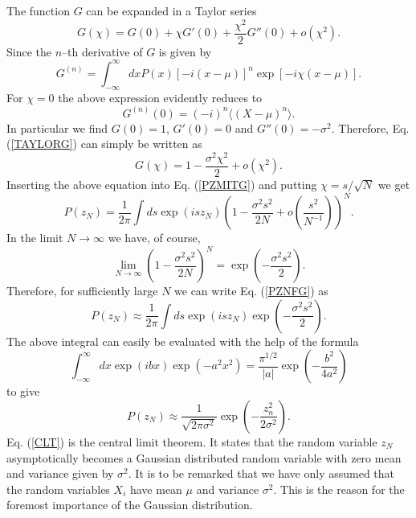 The function $G$ can be expanded in a Taylor series
\begin{equation}\label{TAYLORG}
G(\chi) = G(0) + \chi G'(0) + \frac{\chi^2}{2} G''(0) + o(\chi^2).
\end{equation}
Since the $n$--th derivative of $G$ is given by
\begin{equation}
G^{(n)} = \int_{-\infty}^{\infty} dx P(x) [-i(x-\mu)]^n \exp[-i\chi(x-\mu)].
\end{equation}
For $\chi=0$ the above expression evidently reduces to
\begin{equation}
G^{(n)}(0) = (-i)^n \langle (X-\mu)^n\rangle.
\end{equation}
In particular we find $G(0) =1$, $G'(0)= 0$ and $G''(0) = 
-\sigma^2$.
Therefore, Eq. (\ref{TAYLORG}) can simply be written as
\begin{equation}
G(\chi) = 1 - \frac{\sigma^2\chi^2}{2} + o(\chi^2).
\end{equation}
Inserting the above equation into Eq. (\ref{PZMITG}) 
and putting $\chi=s/{\sqrt{N}}$ we get
\begin{equation}\label{PZNFG}
P(z_N) = \frac{1}{2\pi} \int ds \exp(isz_N)
   \left( 1- \frac{\sigma^2s^2}{2N} + 
   o(\frac{s^2}{N^{-1}})\right)^N.
\end{equation}
In the limit $N\rightarrow \infty$ we have, of course,
\begin{equation}
\lim_{N\rightarrow \infty} \left( 1 - 
\frac{\sigma^2s^2}{2N}\right)^N = \exp(-\frac{\sigma^2 s^2}{2}).
\end{equation}
Therefore, for sufficiently large $N$ we can write Eq. (\ref{PZNFG}) 
as
\begin{equation}
P(z_N) \approx \frac{1}{2\pi} \int ds \exp(isz_N)
      \exp(-\frac{\sigma^2s^2}{2}).
\end{equation}
The above integral can easily be evaluated
with the help of the formula
\begin{equation}
\int_{-\infty}^{\infty} dx \exp(ibx)\exp(-a^2 x^2) =
 \frac{\pi^{1/2}}{|a|} \exp\left(-\frac{b^2}{4a^2} \right)
\end{equation}
 to give
\begin{equation} \label{CLT}
P(z_N) \approx \frac{1}{\sqrt{2\pi \sigma^2}} 
    \exp(-\frac{z_n^2}{2 \sigma^2}).
\end{equation}
Eq. (\ref{CLT}) is the central limit theorem. It states that the 
random variable $z_N$ asymptotically becomes a Gaussian distributed
random variable with zero mean and variance given by $\sigma^2$.
It is to be remarked that we have only assumed that the random 
variables $X_i$ have mean $\mu$ and variance $\sigma^2$. This is 
the reason for the foremost importance of the Gaussian 
distribution.

